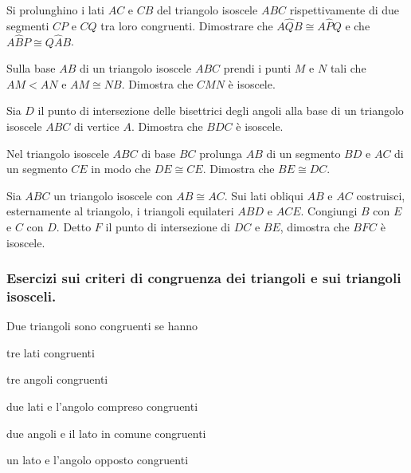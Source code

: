 \begin{multicols}{2}
\begin{esercizio}
\label{ese:2.48}
Si prolunghino i lati $AC$ e $CB$ del triangolo isoscele $ABC$ rispettivamente di due segmenti $CP$ e $CQ$ tra loro congruenti. Dimostrare che $A\widehat{Q}B\cong A\widehat{P}Q$ e che $A\widehat{B}P\cong Q\widehat{A}B$.
\end{esercizio}

\begin{esercizio}
\label{ese:2.49}
Sulla base $AB$ di un triangolo isoscele $ABC$ prendi i punti $M$ e $N$ tali che $AM<AN$ e $AM\cong NB$. Dimostra che $CMN$ è isoscele.
\end{esercizio}

\begin{esercizio}
\label{ese:2.50}
Sia $D$ il punto di intersezione delle bisettrici degli angoli alla base di un triangolo isoscele $ABC$ di vertice $A$. Dimostra che $BDC$ è isoscele.
\end{esercizio}

\begin{esercizio}
\label{ese:2.51}
Nel triangolo isoscele $ABC$ di base $BC$ prolunga $AB$ di un segmento $BD$ e $AC$ di un segmento $CE$ in modo che $DE\cong CE$. Dimostra che $BE\cong DC$.
\end{esercizio}

\begin{esercizio}
\label{ese:2.52}
Sia $ABC$ un triangolo isoscele con $AB\cong AC$. Sui lati obliqui $AB$ e $AC$ costruisci, esternamente al triangolo, i triangoli equilateri $ABD$ e $ACE$. Congiungi $B$ con $E$ e $C$ con $D$. Detto $F$ il punto di intersezione di $DC$ e $BE$, dimostra che $BFC$ è isoscele.
\end{esercizio}

\subsubsection*{Esercizi sui criteri di congruenza dei triangoli e sui triangoli isosceli.}

\begin{esercizio}
\label{ese:2.53}
Due triangoli sono congruenti se hanno
\begin{enumeratea}
\item tre lati congruenti \hfill\boxV\quad\boxF
\item tre angoli congruenti \hfill\boxV\quad\boxF
\item due lati e l'angolo compreso congruenti\tab\hfill\boxV\quad\boxF
\item due angoli e il lato in comune congruenti\tab\hfill\boxV\quad\boxF
\item un lato e l'angolo opposto congruenti\tab\tab\hfill\boxV\quad\boxF
\end{enumeratea}
\end{esercizio}


\end{multicols}
